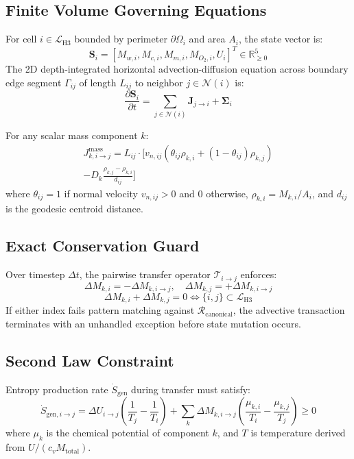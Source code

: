 \documentclass[10pt,journal,compsoc]{IEEEtran}
\begin{document}
\subsection{Finite Volume Governing Equations}
For cell $i \in \mathcal{L}_{\text{H3}}$ bounded by perimeter $\partial \Omega_i$ and area $A_i$, the state vector is:
\begin{equation}
    \mathbf{S}_i = \left[ M_{w, i}, M_{c, i}, M_{m, i}, M_{O_2, i}, U_i \right]^T \in \mathbb{R}_{\ge 0}^5
\end{equation}
The 2D depth-integrated horizontal advection-diffusion equation across boundary edge segment $\Gamma_{ij}$ of length $L_{ij}$ to neighbor $j \in \mathcal{N}(i)$ is:
\begin{equation}
    \frac{\partial \mathbf{S}_i}{\partial t} = \sum_{j \in \mathcal{N}(i)} \mathbf{J}_{j \to i} + \mathbf{\Sigma}_i
\end{equation}

For any scalar mass component $k$:
\begin{multline}
    J_{k, i \to j}^{\text{mass}} = L_{ij} \cdot \Big[ v_{n, ij} \left( \theta_{ij} \rho_{k, i} + (1 - \theta_{ij}) \rho_{k, j} \right) \\
    - D_k \frac{\rho_{k, j} - \rho_{k, i}}{d_{ij}} \Big]
\end{multline}
where $\theta_{ij} = 1$ if normal velocity $v_{n, ij} > 0$ and $0$ otherwise, $\rho_{k, i} = M_{k, i} / A_i$, and $d_{ij}$ is the geodesic centroid distance.

\subsection{Exact Conservation Guard}
Over timestep $\Delta t$, the pairwise transfer operator $\mathcal{T}_{i \to j}$ enforces:
\begin{equation}
    \Delta M_{k, i} = - \Delta M_{k, i \to j}, \quad \Delta M_{k, j} = + \Delta M_{k, i \to j}
\end{equation}
\begin{equation}
    \Delta M_{k, i} + \Delta M_{k, j} = 0 \iff \{i, j\} \subset \mathcal{L}_{\text{H3}}
\end{equation}
If either index fails pattern matching against $\mathcal{R}_{\text{canonical}}$, the advective transaction terminates with an unhandled exception before state mutation occurs.

\subsection{Second Law Constraint}
Entropy production rate $\dot{S}_{\text{gen}}$ during transfer must satisfy:
\begin{equation}
    \dot{S}_{\text{gen}, i \to j} = \Delta U_{i \to j} \left( \frac{1}{T_j} - \frac{1}{T_i} \right) + \sum_{k} \Delta M_{k, i \to j} \left( \frac{\mu_{k, i}}{T_i} - \frac{\mu_{k, j}}{T_j} \right) \ge 0
\end{equation}
where $\mu_{k}$ is the chemical potential of component $k$, and $T$ is temperature derived from $U / (c_v M_{\text{total}})$.
\end{document}
